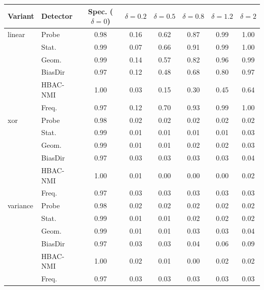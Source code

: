 \begin{tabular}{llcccccc}
\toprule
Variant & Detector & Spec. ($\delta=0$) & $\delta=0.2$ & $\delta=0.5$ & $\delta=0.8$ & $\delta=1.2$ & $\delta=2$ \\
\midrule
linear & Probe & 0.98 & 0.16 & 0.62 & 0.87 & 0.99 & 1.00 \\
 & Stat. & 0.99 & 0.07 & 0.66 & 0.91 & 0.99 & 1.00 \\
 & Geom. & 0.99 & 0.14 & 0.57 & 0.82 & 0.96 & 0.99 \\
 & BiasDir & 0.97 & 0.12 & 0.48 & 0.68 & 0.80 & 0.97 \\
 & HBAC-NMI & 1.00 & 0.03 & 0.15 & 0.30 & 0.45 & 0.64 \\
 & Freq. & 0.97 & 0.12 & 0.70 & 0.93 & 0.99 & 1.00 \\
\midrule
xor & Probe & 0.98 & 0.02 & 0.02 & 0.02 & 0.02 & 0.02 \\
 & Stat. & 0.99 & 0.01 & 0.01 & 0.01 & 0.01 & 0.03 \\
 & Geom. & 0.99 & 0.01 & 0.01 & 0.02 & 0.02 & 0.03 \\
 & BiasDir & 0.97 & 0.03 & 0.03 & 0.03 & 0.03 & 0.04 \\
 & HBAC-NMI & 1.00 & 0.01 & 0.00 & 0.00 & 0.00 & 0.02 \\
 & Freq. & 0.97 & 0.03 & 0.03 & 0.03 & 0.03 & 0.03 \\
\midrule
variance & Probe & 0.98 & 0.02 & 0.02 & 0.02 & 0.02 & 0.02 \\
 & Stat. & 0.99 & 0.01 & 0.01 & 0.02 & 0.02 & 0.02 \\
 & Geom. & 0.99 & 0.01 & 0.01 & 0.03 & 0.03 & 0.04 \\
 & BiasDir & 0.97 & 0.03 & 0.03 & 0.04 & 0.06 & 0.09 \\
 & HBAC-NMI & 1.00 & 0.02 & 0.01 & 0.00 & 0.02 & 0.02 \\
 & Freq. & 0.97 & 0.03 & 0.03 & 0.03 & 0.03 & 0.03 \\
\bottomrule
\end{tabular}
